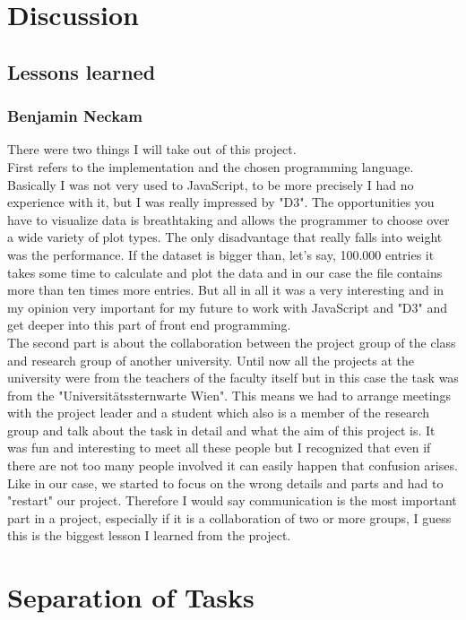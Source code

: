 \documentclass{vgtc}                          %
\begin{document}
\section{Discussion}
\subsection{Lessons learned}
\subsubsection{Benjamin Neckam}
There were two things I will take out of this project.\\
First refers to the implementation and the chosen programming language. Basically I was not very used to JavaScript, to be more precisely I had no experience with it, but I was really impressed by "D3". The opportunities you have to visualize data is breathtaking and allows the programmer to choose over a wide variety of plot types. The only disadvantage that really falls into weight was the performance. If the dataset is bigger than, let's say, 100.000 entries it takes some time to calculate and plot the data and in our case the file contains more than ten times more entries. But all in all it was a very interesting and in my opinion very important for my future to work with JavaScript and "D3" and get deeper into this part of front end programming.\\
The second part is about the collaboration between the project group of the class and research group of another university. Until now all the projects at the university were from the teachers of the faculty itself but in this case the task was from the "Universitätssternwarte Wien". This means we had to arrange meetings with the project leader and a student which also is a member of the research group and talk about the task in detail and what the aim of this project is. It was fun and interesting to meet all these people but I recognized that even if there are not too many people involved it can easily happen that confusion arises. Like in our case, we started to focus on the wrong details and parts and had to "restart" our project. Therefore I would say communication is the most important part in a project, especially if it is a collaboration of two or more groups, I guess this is the biggest lesson I learned from the project. 
\section{Separation of Tasks}




\end{document}

